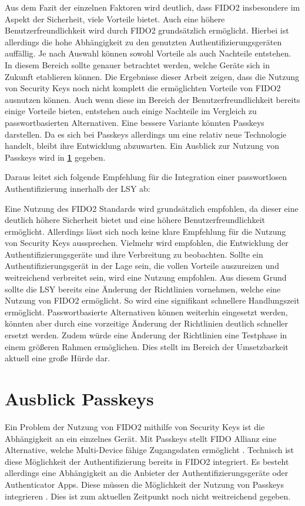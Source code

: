 Aus dem Fazit der einzelnen Faktoren wird deutlich, dass \ac{FIDO}2 insbesondere im Aspekt der Sicherheit, viele Vorteile bietet. Auch eine höhere Benutzerfreundlichkeit wird durch \ac{FIDO}2 grundsätzlich ermöglicht. Hierbei ist allerdings die hohe Abhängigkeit zu den genutzten Authentifizierungsgeräten auffällig. Je nach Auswahl können sowohl Vorteile als auch Nachteile entstehen. In diesem Bereich sollte genauer betrachtet werden, welche Geräte sich in Zukunft etablieren können. Die Ergebnisse dieser Arbeit zeigen, dass die Nutzung von Security Keys noch nicht komplett die ermöglichten Vorteile von \ac{FIDO}2 ausnutzen können. Auch wenn diese im Bereich der Benutzerfreundlichkeit bereits einige Vorteile bieten, entstehen auch einige Nachteile im Vergleich zu passwortbasierten Alternativen. Eine bessere Variante könnten Passkeys darstellen. Da es sich bei Passkeys allerdings um eine relativ neue Technologie handelt, bleibt ihre Entwicklung abzuwarten. Ein Ausblick zur Nutzung von Passkeys wird in \textbf{\ref{passkeys}} gegeben.

Daraus leitet sich folgende Empfehlung für die Integration einer passwortlosen Authentifizierung innerhalb der \ac{LSY} ab:

Eine Nutzung des \ac{FIDO}2 Standards wird grundsätzlich empfohlen, da dieser eine deutlich höhere Sicherheit bietet und eine höhere Benutzerfreundlichkeit ermöglicht. Allerdings lässt sich noch keine klare Empfehlung für die Nutzung von Security Keys aussprechen. Vielmehr wird empfohlen, die Entwicklung der Authentifizierungsgeräte und ihre Verbreitung zu beobachten. Sollte ein Authentifizierungsgerät in der Lage sein, die vollen Vorteile auszureizen und weitreichend verbreitet sein, wird eine Nutzung empfohlen. Aus diesem Grund sollte die \ac{LSY} bereits eine Änderung der Richtlinien vornehmen, welche eine Nutzung von \ac{FIDO}2 ermöglicht. So wird eine signifikant schnellere Handlungszeit ermöglicht. Passwortbasierte Alternativen können weiterhin eingesetzt werden, könnten aber durch eine vorzeitige Änderung der Richtlinien deutlich schneller ersetzt werden. Zudem würde eine Änderung der Richtlinien eine Testphase in einem größeren Rahmen ermöglichen. Dies stellt im Bereich der Umsetzbarkeit aktuell eine große Hürde dar.


\chapter{Ausblick Passkeys} \label{passkeys}
Ein Problem der Nutzung von \ac{FIDO}2 mithilfe von Security Keys ist die Abhängigkeit an ein einzelnes Gerät. Mit Passkeys stellt \ac{FIDO} Allianz eine Alternative, welche Multi-Device fähige Zugangsdaten ermöglicht \cite{usecasfido}.
Technisch ist diese Möglichkeit der Authentifizierung bereits in \ac{FIDO}2 integriert. Es besteht allerdings eine Abhängigkeit an die Anbieter der Authentifizierungsgeräte oder Authenticator Apps. Diese müssen die Möglichkeit der Nutzung von Passkeys integrieren \cite{usecasfido}. Dies ist zum aktuellen Zeitpunkt noch nicht weitreichend gegeben.

